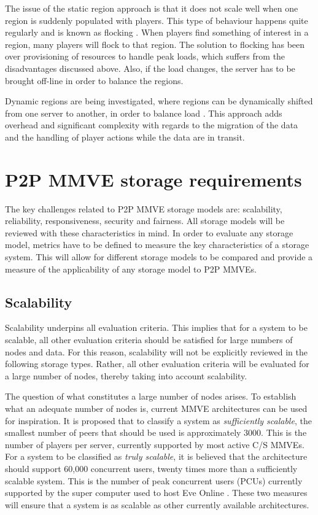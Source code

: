 The issue of the static region approach is that it does not scale well when one region is suddenly populated with players. This type of behaviour
happens quite regularly and is known as flocking \cite{flocking}. When players find something of interest in a region, many players will flock to
that region. The solution to flocking has been over provisioning of resources to handle peak loads, which suffers from the disadvantages discussed above. Also, if the load changes, the server has to be brought off-line in order to balance the regions.

Dynamic regions are being investigated, where regions can be dynamically shifted from one server to another, in order to balance load
\cite{zone_based_dyn}. This approach adds overhead and significant complexity with regards to the migration of the data and the handling of player actions while the data are in transit.

\section{P2P MMVE storage requirements}
\label{key_challenges_cm}

The key challenges related to P2P MMVE storage models are: scalability, reliability, responsiveness, security and fairness. All storage models will be reviewed with these characteristics in mind. In order to evaluate any storage model, metrics have to be defined to measure the key characteristics of a storage system. This will allow for different storage models to be compared and provide a measure of the applicability of any storage model to P2P MMVEs.

\subsection{Scalability}
\label{scalability_req}
Scalability underpins all evaluation criteria. This implies that for a system to be scalable, all other evaluation criteria should be satisfied for
large numbers of nodes and data. For this reason, scalability will not be explicitly reviewed in the following storage types. Rather, all other
evaluation criteria will be evaluated for a large number of nodes, thereby taking into account scalability.

The question of what constitutes a large number of nodes arises. To establish what an adequate number of nodes is, current MMVE architectures can be
used for inspiration. It is proposed that to classify a system as \emph{sufficiently scalable}, the smallest number of peers that should be used is
approximately 3000. This is the number of players per server, currently supported by most active C/S MMVEs. For a system to be classified as
\emph{truly scalable}, it is believed that the architecture should support 60,000 concurrent users, twenty times more than a sufficiently scalable
system. This is the number of peak concurrent users (PCUs) currently supported by the super computer used to host Eve Online \cite{eve_pcu}. These
two measures will ensure that a system is as scalable as other currently available architectures.

